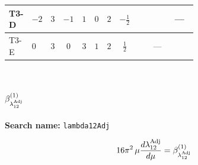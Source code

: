 \documentclass[8pt]{article}
\begin{document}
\begin{landscape}
\begin{longtable}{@{}llcccccc >{\raggedright\arraybackslash}p{0.21\linewidth} >{\raggedright\arraybackslash}p{0.21\linewidth} >{\raggedright\arraybackslash}p{0.21\linewidth}@{}}
\midrule
T3-D & $-2$ & $3$ & $-1$ & $1$ & $0$ & $2$ & $-\frac{1}{2}$ & \scriptsize\adjustbox{max width=\linewidth}{$\begin{gathered} -\frac{9 {g_Y}^2 {\lambda_{T3}}}{2}\end{gathered}$} & \scriptsize\adjustbox{max width=\linewidth}{$\begin{gathered} {\lambda_{T3}} (6 \operatorname{Tr}\!\left({Y_d}\,\left({Y_d}\right)^{\dagger}\right)+2 \operatorname{Tr}\!\left({Y_e}\,\left({Y_e}\right)^{\dagger}\right)+6 \operatorname{Tr}\!\left({Y_u}\,\left({Y_u}\right)^{\dagger}\right)-4 {\lambda_{H1}^{\rm Adj}})\end{gathered}$} & --- \\
\midrule
T3-E & $0$ & $3$ & $0$ & $3$ & $1$ & $2$ & $\frac{1}{2}$ & \scriptsize\adjustbox{max width=\linewidth}{$\begin{gathered} -\frac{9 {g_Y}^2 {\lambda_{T3}}}{2}\end{gathered}$} & --- & \scriptsize\adjustbox{max width=\linewidth}{$\begin{gathered} {\lambda_{T3}} \left(6 \operatorname{Tr}\!\left({Y_d}\,\left({Y_d}\right)^{\dagger}\right)+2 \operatorname{Tr}\!\left({Y_e}\,\left({Y_e}\right)^{\dagger}\right)+6 \operatorname{Tr}\!\left({Y_u}\,\left({Y_u}\right)^{\dagger}\right)-\frac{4 {\lambda_{12}^{\rm Adj}}}{3}-2 {\lambda_{12}^{\rm Cross}}-2 {\lambda_{H1}^{\rm Adj}}-\frac{4 {\lambda_{H2}^{\rm Adj}}}{3}\right)\end{gathered}$} \\
\midrule
\bottomrule
\end{longtable}
\clearpage
\section*{$\beta_{\lambda_{12}^{\rm Adj}}^{(1)}$}
\noindent\textbf{Search name: }\texttt{lambda12Adj}\par\smallskip
\[16\pi^2\,\mu\frac{d \lambda_{12}^{\rm Adj}}{d\mu}=\beta_{\lambda_{12}^{\rm Adj}}^{(1)}\]

\end{landscape}
\end{document}
